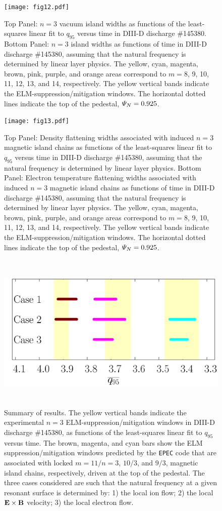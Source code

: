 \documentclass[12pt,prb,aps]{revtex4-1}
\begin{document}
\begin{figure}
\texttt{[image: fig12.pdf]}
\caption{Top Panel: $n=3$ vacuum island widths as functions of the least-squares linear fit to $q_{95}$ versus time
in   DIII-D discharge \#145380.
Bottom Panel:  $n=3$ island widths as functions of time
in   DIII-D discharge \#145380, assuming that the natural frequency is determined by linear layer physics. The yellow, cyan, magenta, brown, pink,
purple, and orange  areas correspond to $m=8$,  9, 10, 11, 12, 13, and 14, respectively. The yellow vertical bands indicate the ELM-suppression/mitigation windows. 
The horizontal dotted lines indicate the top of the pedestal, ${\mit\Psi}_N=0.925$.} \label{fig12}
\end{figure}

\begin{figure}
\texttt{[image: fig13.pdf]}
\caption{Top Panel: Density flattening widths associated with induced $n=3$ magnetic island  chains as functions of the least-squares linear fit to $q_{95}$ versus time
in   DIII-D discharge \#145380, assuming that the natural frequency is determined by linear layer physics.
Bottom Panel:  Electron temperature flattening widths associated with induced $n=3$ magnetic island chains as functions of time
in   DIII-D discharge \#145380, assuming that the natural frequency is determined by linear layer physics. The yellow, cyan, magenta, brown, pink,
purple, and orange  areas correspond to $m=8$, 9, 10, 11, 12, 13, and 14, respectively. The yellow vertical bands indicate the ELM-suppression/mitigation windows. 
The horizontal dotted lines indicate  the top of the pedestal, ${\mit\Psi}_N=0.925$.} \label{fig13}
\end{figure}

\begin{figure}
\includegraphics[height=3in]{fig14.pdf}
\caption{Summary of results. The yellow vertical bands indicate the experimental $n=3$ ELM-suppression/mitigation windows in DIII-D discharge \#145380, as functions  of the least-squares linear fit to $q_{95}$ versus time. 
The brown, magenta, and cyan bars show the  ELM suppression/mitigation windows predicted by the {\tt EPEC} code that are associated with locked $m=11/n=3$, $10/3$, and $9/3$, magnetic island chains, respectively, 
driven at the top of the pedestal. The three cases considered are such that the natural frequency at a given resonant surface is determined by:
1) the local ion flow; 2) the local ${\bf E}\times {\bf B}$ velocity; 3) the local electron flow.}\label{fig14}
\end{figure}
\end{document}
